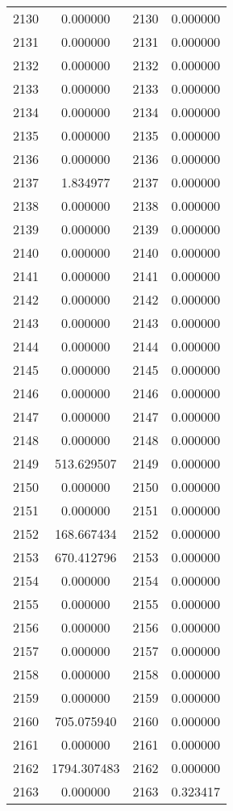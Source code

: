 \documentclass[12pt]{article}
\begin{document}
\begin{longtable}{@{}cccc@{}}
2130 & 0.000000 & 2130 & 0.000000 \\
2131 & 0.000000 & 2131 & 0.000000 \\
2132 & 0.000000 & 2132 & 0.000000 \\
2133 & 0.000000 & 2133 & 0.000000 \\
2134 & 0.000000 & 2134 & 0.000000 \\
2135 & 0.000000 & 2135 & 0.000000 \\
2136 & 0.000000 & 2136 & 0.000000 \\
2137 & 1.834977 & 2137 & 0.000000 \\
2138 & 0.000000 & 2138 & 0.000000 \\
2139 & 0.000000 & 2139 & 0.000000 \\
2140 & 0.000000 & 2140 & 0.000000 \\
2141 & 0.000000 & 2141 & 0.000000 \\
2142 & 0.000000 & 2142 & 0.000000 \\
2143 & 0.000000 & 2143 & 0.000000 \\
2144 & 0.000000 & 2144 & 0.000000 \\
2145 & 0.000000 & 2145 & 0.000000 \\
2146 & 0.000000 & 2146 & 0.000000 \\
2147 & 0.000000 & 2147 & 0.000000 \\
2148 & 0.000000 & 2148 & 0.000000 \\
2149 & 513.629507 & 2149 & 0.000000 \\
2150 & 0.000000 & 2150 & 0.000000 \\
2151 & 0.000000 & 2151 & 0.000000 \\
2152 & 168.667434 & 2152 & 0.000000 \\
2153 & 670.412796 & 2153 & 0.000000 \\
2154 & 0.000000 & 2154 & 0.000000 \\
2155 & 0.000000 & 2155 & 0.000000 \\
2156 & 0.000000 & 2156 & 0.000000 \\
2157 & 0.000000 & 2157 & 0.000000 \\
2158 & 0.000000 & 2158 & 0.000000 \\
2159 & 0.000000 & 2159 & 0.000000 \\
2160 & 705.075940 & 2160 & 0.000000 \\
2161 & 0.000000 & 2161 & 0.000000 \\
2162 & 1794.307483 & 2162 & 0.000000 \\
2163 & 0.000000 & 2163 & 0.323417 \\

\end{longtable}
\end{document}
